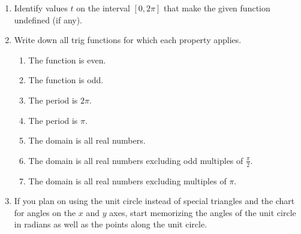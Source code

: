 \begin{enumerate}
\newpage
\item Identify values $t$ on the interval $[0,2\pi]$ that make the given function undefined (if any).
\begin{enumerate}
\end{enumerate}

\item Write down all trig functions for which each property applies.
\begin{enumerate}
\item The function is even.\vfill
\item The function is odd.\vfill
\item The period is $2\pi$.\vfill
\item The period is $\pi$.\vfill
\item The domain is all real numbers.\vfill
\item The domain is all real numbers excluding odd multiples of $\frac{\pi}{2}$.\vfill
\item The domain is all real numbers excluding multiples of $\pi$.\vfill
\end{enumerate}
\newpage

\item If you plan on using the unit circle instead of special triangles and the chart for angles on the $x$ and $y$ axes, start memorizing the angles of the unit circle in radians as well as the points along the unit circle.
\end{enumerate}

